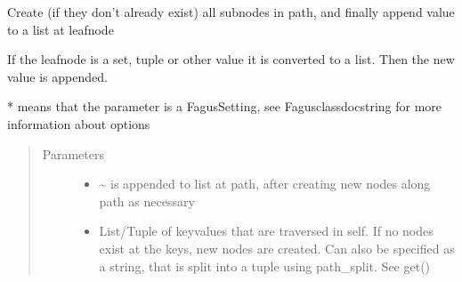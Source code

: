 \documentclass[a4paper,10pt,english]{sphinxmanual}
\begin{document}
\begin{fulllineitems}
\begin{fulllineitems}
\label{\detokenize{fagus.fagus:fagus.fagus.Fagus.append}}
\pysigstartsignatures
{}
\pysigstopsignatures
\sphinxAtStartPar
Create (if they don’t already exist) all sub\sphinxhyphen{}nodes in path, and finally append value to a list at leaf\sphinxhyphen{}node

\sphinxAtStartPar
If the leaf\sphinxhyphen{}node is a set, tuple or other value it is converted to a list. Then the new value is appended.

\sphinxAtStartPar
* means that the parameter is a Fagus\sphinxhyphen{}Setting, see Fagus\sphinxhyphen{}class\sphinxhyphen{}docstring for more information about options
\begin{quote}\begin{description}
\item[{Parameters}] \leavevmode\begin{itemize}
\item {}
\sphinxAtStartPar
{} \textendash{} \textasciitilde{} is appended to list at path, after creating new nodes along path as necessary

\item {}
\sphinxAtStartPar
{} \textendash{} List/Tuple of key\sphinxhyphen{}values that are traversed in self. If no nodes exist at the keys, new nodes are
created. Can also be specified as a string, that is split into a tuple using path\_split. See get()


\end{itemize}
\end{description}
\end{quote}
\end{fulllineitems}
\end{fulllineitems}
\end{document}
